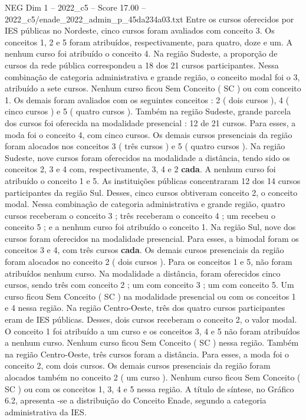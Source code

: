 \begin{textsample}{NEG Dim 1 – 2022\_c5 – Score 17.00 – 2022\_c5/enade\_2022\_admin\_p\_45da234a03.txt}
Entre os cursos oferecidos por IES públicas no Nordeste, cinco cursos foram avaliados com conceito 3.
Os conceitos 1, 2 e 5 foram atribuídos, respectivamente, para quatro, doze e um.
A nenhum curso foi atribuído o conceito 4.
Na região Sudeste, a proporção de cursos da rede pública correspondeu a 18 dos 21 cursos participantes.
Nessa combinação de categoria administrativa e grande região, o conceito modal foi o 3, atribuído a sete cursos.
Nenhum curso ficou Sem Conceito ( SC ) ou com conceito 1.
Os demais foram avaliados com os seguintes conceitos : 2 ( dois cursos ), 4 ( cinco cursos ) e 5 ( quatro cursos ).
Também na região Sudeste, grande parcela dos cursos foi oferecida na modalidade presencial : 12 de 21 cursos.
Para esses, a moda foi o conceito 4, com cinco cursos.
Os demais cursos presenciais da região foram alocados nos conceitos 3 ( três cursos ) e 5 ( quatro cursos ).
Na região Sudeste, nove cursos foram oferecidos na modalidade a distância, tendo sido os conceitos 2, 3 e 4 com, respectivamente, 3, 4 e 2 \textbf{cada}.
A nenhum curso foi atribuído o conceito 1 e 5.
As instituições públicas concentraram 12 dos 14 cursos participantes da região Sul.
Desses, cinco cursos obtiveram conceito 2, o conceito modal.
Nessa combinação de categoria administrativa e grande região, quatro cursos receberam o conceito 3 ; três receberam o conceito 4 ; um recebeu o conceito 5 ; e a nenhum curso foi atribuído o conceito 1.
Na região Sul, nove dos cursos foram oferecidos na modalidade presencial.
Para esses, a bimodal foram os conceitos 3 e 4, com três cursos \textbf{cada}.
Os demais cursos presenciais da região foram alocados no conceito 2 ( dois cursos ).
Para os conceitos 1 e 5, não foram atribuídos nenhum curso.
Na modalidade a distância, foram oferecidos cinco cursos, sendo três com conceito 2 ; um com conceito 3 ; um com conceito 5.
Um curso ficou Sem Conceito ( SC ) na modalidade presencial ou com os conceitos 1 e 4 nessa região.
Na região Centro-Oeste, três dos quatro cursos participantes eram de IES públicas.
Desses, dois cursos receberam o conceito 2, o valor modal.
O conceito 1 foi atribuído a um curso e os conceitos 3, 4 e 5 não foram atribuídos a nenhum curso.
Nenhum curso ficou Sem Conceito ( SC ) nessa região.
Também na região Centro-Oeste, três cursos foram a distância.
Para esses, a moda foi o conceito 2, com dois cursos.
Os demais cursos presenciais da região foram alocados também no conceito 2 ( um curso ).
Nenhum curso ficou Sem Conceito ( SC ) ou com os conceitos 1, 3, 4 e 5 nessa região.
A título de síntese, no Gráfico 6.2, apresenta -se a distribuição do Conceito Enade, segundo a categoria administrativa da IES.

\end{textsample}
